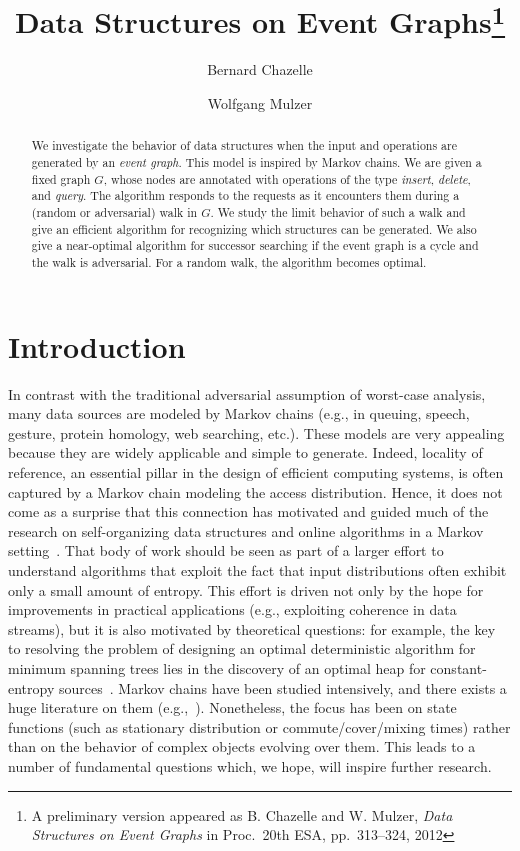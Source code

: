 \documentclass[oribibl,envcountsect,envcountsame]{llncs}
\title{Data Structures on Event Graphs\thanks{A preliminary
version appeared as B. Chazelle and W. Mulzer,
\emph{Data Structures on Event Graphs} in Proc.~20th ESA, pp.~313--324, 2012}}
\date{}
\author{
Bernard Chazelle\inst{1}
\and
Wolfgang Mulzer\inst{2}
}
\institute{
Department of Computer Science, Princeton University, USA
\email{chazelle@cs.princeton.edu}
\and
Institut f{\"ur} Informatik, Freie Universit{\"a}t Berlin, Germany
\email{mulzer@inf.fu-berlin.de}
}
\begin{document}
 \maketitle

\begin{abstract}
We investigate the behavior of 
data structures when the input
and operations are generated by an
\emph{event graph}. 
This model is inspired by 
Markov chains.
We are given a fixed graph $G$,
whose nodes 
are annotated with operations of the type 
\emph{insert}, \emph{delete}, and \emph{query}.
The algorithm responds to the requests 
as it encounters them during a (random or adversarial) walk in $G$.
We study the  limit behavior  of such a 
walk and give an efficient algorithm for recognizing which structures
can be generated.
We also give a near-optimal algorithm for successor searching if
the event graph is a cycle and the walk is adversarial. For a random
walk, the algorithm becomes optimal. 
\end{abstract}




\section{Introduction}\label{introduction}

In contrast with the traditional adversarial assumption
of worst-case analysis,
many data sources are modeled by Markov chains
(e.g., in queuing, speech, gesture, protein homology,
web searching, etc.). These models are very appealing
because they are  widely applicable and simple
to generate.
Indeed, locality of reference, an essential pillar in the
design of efficient computing systems, is often captured by 
a Markov chain modeling the access distribution.
Hence, it does not come as a surprise that 
this connection has motivated and guided much
of the research on self-organizing data 
structures and online algorithms
in a Markov setting~\cite{Chassaing93,Hotz93,KapoorRe91,KarlinPhRa00,
KonnekerVa81,LamLeSi84,PhatarfodPrDy97,SchulzSc96,ShedlerTu72,VitterKr96}.
That body of work should be seen as part of 
a larger effort to understand
algorithms that exploit the fact that
input distributions often exhibit only a small amount
of entropy. This effort is driven not only by the
hope for improvements in practical applications 
(e.g., exploiting coherence in data streams),
but it is also motivated by theoretical questions: for example, the key 
to resolving the problem of designing an optimal
deterministic algorithm for minimum spanning trees lies in
the discovery of an optimal heap for constant-entropy 
sources~\cite{Chazelle00}.
Markov chains have been studied intensively, and there
exists a huge literature on them (e.g.,~\cite{LevinPeWi09}).
Nonetheless, the focus has been on state functions
(such as stationary distribution or commute/cover/mixing times)
rather than on the behavior of complex objects evolving over them.
This leads to a number of fundamental questions which, we hope,
will inspire further research.
\end{document}
